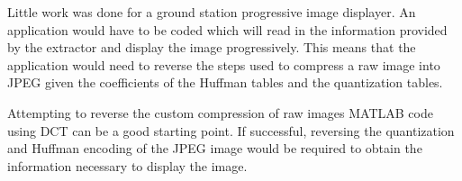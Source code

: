 Little work was done for a ground station progressive image displayer. An application would have to be coded which will read in the information provided by the extractor and display the image progressively. This means that the application would need to reverse the steps used to compress a raw image into JPEG given the coefficients of the Huffman tables and the quantization tables. 

Attempting to reverse the custom compression of raw images MATLAB code using DCT can be a good starting point. If successful, reversing the quantization and Huffman encoding of the JPEG image would be required to obtain the information necessary to display the image.
